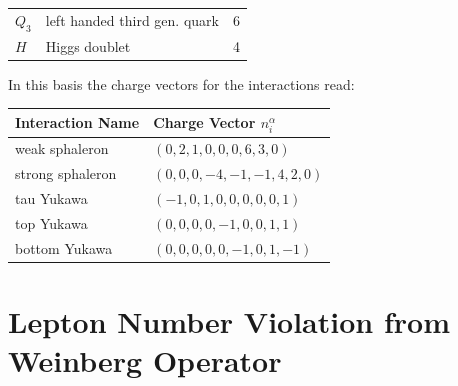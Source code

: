\documentclass[master,       %
               twoside,        %
               BCOR10mm,       %
               english,ngerman, %
               ]{GAUBM}
\begin{document}
\begin{otherlanguage}{english}
\begin{table}[H]
\begin{center}
\begin{tabular}{lll}
			$Q_3$ & left handed third gen. quark  & 6 \\
			$H$ & Higgs doublet & 4 \\
		\end{tabular}
	\end{center}
\end{table}
In this basis the charge vectors for the interactions read:
\begin{table}[H]
	\begin{center}
		\begin{tabular}{ll}
			Interaction Name & Charge Vector $n^\alpha_i$ \\
			\hline
			weak sphaleron & $(0,2,1,0,0,0,6,3,0)$ \\
			strong sphaleron & $(0,0,0,-4,-1,-1,4,2,0)$ \\
			tau Yukawa & $(-1,0,1,0,0,0,0,0,1)$ \\
			top Yukawa & $(0,0,0,0,-1,0,0,1,1)$ \\
			bottom Yukawa & $(0,0,0,0,0,-1,0,1,-1)$ \\
		\end{tabular}
	\end{center}
\end{table}


\section{Lepton Number Violation from Weinberg Operator}
\label{sec:lepton_number_violation_from_weinberg_operator}


\end{otherlanguage}
\end{document}
